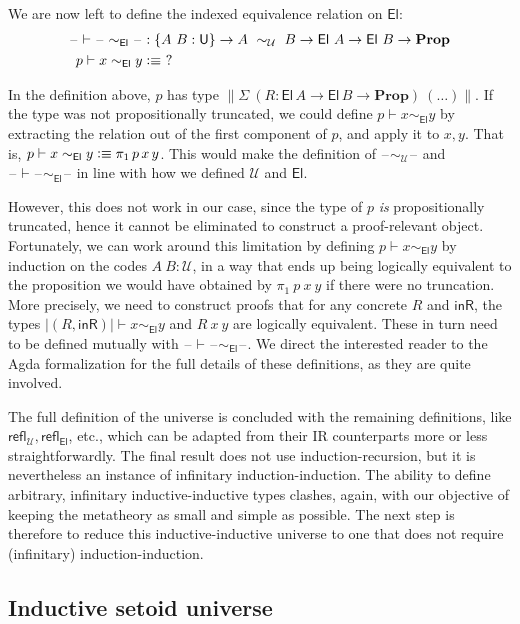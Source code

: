 \documentclass[autoref]{llncs}
\newcommand{\setoidU}{\mathcal{U}}
\newcommand{\mProp}{\mathbf{Prop}}
\newcommand{\U}{\textsf{U}}
\newcommand{\El}{\textsf{El}}
\newcommand{\reflu}{\textsf{refl}_\setoidU}
\newcommand{\reflel}{\textsf{refl}_\El}
\newcommand{\blank}{\mathord{\hspace{1pt}\text{--}\hspace{1pt}}}
\newcommand{\defeq}{\mathrel{\vcentcolon\equiv}}
\begin{document}
We are now left to define the indexed equivalence relation on $\El$:
\vspace{-0.2em}
\begin{align*}
  \blank\vdash\blank\sim_{\El}\blank & : \{A\ B : \U\} \to A\ \sim_{\setoidU}\ B \to \El\ A \to \El\ B \to \mProp \\
  p \vdash x \sim_{\El} y & \defeq \ ?
\end{align*}

In the definition above, $p$ has type $\| \Sigma\ (R: \El\,A \to \El\,B \to
\mProp)\ (\ldots) \|$. If the type was not propositionally truncated, we could define
$p \vdash x \sim_{\El} y$ by extracting the relation out of the first component
of $p$, and apply it to $x, y$. That is, $p \vdash x \sim_{\El} y \defeq
\pi_1\,p\,x\,y$. This would make the definition of $\blank\sim_\setoidU\blank$ and
$\blank\vdash\blank\sim_{\El}\blank$ in line with how we defined $\setoidU$ and $\El$.

However, this does not work in our case, since the type of $p$ \emph{is}
propositionally truncated, hence it cannot be eliminated to construct a
proof-relevant object.
%
Fortunately, we can work around this limitation by defining $p \vdash x
\sim_{\El} y$ by induction on the codes $A\ B : \setoidU$, in a way that ends
up being logically equivalent to the proposition we would have obtained by
$\pi_1\ p\ x\ y$ if there were no truncation.
%
More precisely, we need to construct proofs that for any concrete $R$ and
$\mathsf{inR}$, the types $| (R, \mathsf{inR}) | \vdash x \sim_{\El} y$ and $R\ x\ y$
are logically equivalent. These in turn need to be defined mutually with
$\blank\vdash\blank\sim_{\El}\blank$. We direct the interested reader to the Agda
formalization for the full details of these definitions, as they are quite
involved.

The full definition of the universe is concluded with the remaining definitions,
like $\reflu, \reflel$, etc., which can be adapted from their IR counterparts
more or less straightforwardly. The final result does not use
induction-recursion, but it is nevertheless an instance of infinitary
induction-induction. The ability to define arbitrary, infinitary
inductive-inductive types clashes, again, with our objective of keeping the
metatheory as small and simple as possible. The next step is therefore to reduce
this inductive-inductive universe to one that does not require (infinitary)
induction-induction.

\subsection{Inductive setoid universe}
\end{document}

